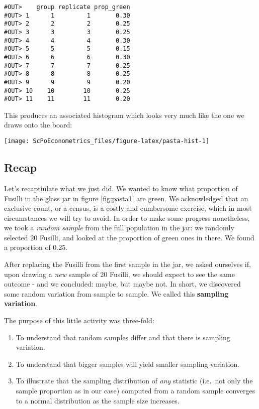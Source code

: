 \documentclass[]{book}
\providecommand{\tightlist}{%
  \setlength{\itemsep}{0pt}\setlength{\parskip}{0pt}}
\begin{document}
\begin{verbatim}
#OUT>    group replicate prop_green
#OUT> 1      1         1       0.30
#OUT> 2      2         2       0.25
#OUT> 3      3         3       0.25
#OUT> 4      4         4       0.30
#OUT> 5      5         5       0.15
#OUT> 6      6         6       0.30
#OUT> 7      7         7       0.25
#OUT> 8      8         8       0.25
#OUT> 9      9         9       0.20
#OUT> 10    10        10       0.25
#OUT> 11    11        11       0.20
\end{verbatim}

This produces an associated histogram which looks very much like the one we draws onto the board:

\begin{center}\texttt{[image: ScPoEconometrics\_files/figure-latex/pasta-hist-1]} \end{center}

\hypertarget{recap}{%
\subsection{Recap}\label{recap}}

Let's recaptiulate what we just did. We wanted to know what proportion of Fusilli in the glass jar in figure \ref{fig:pasta1} are green. We acknowledged that an exclusive count, or a census, is a costly and cumbersome exercise, which in most circumstances we will try to avoid. In order to make some progress nonetheless, we took a \emph{random sample} from the full population in the jar: we randomly selected 20 Fusilli, and looked at the proportion of green ones in there. We found a proportion of 0.25.

After replacing the Fusilli from the first sample in the jar, we asked ourselves if, upon drawing a \emph{new} sample of 20 Fusilli, we should expect to see the same outcome - and we concluded: maybe, but maybe not. In short, we discovered some random variation from sample to sample. We called this \textbf{sampling variation}.

The purpose of this little activity was three-fold:

\begin{enumerate}
\def\labelenumi{\arabic{enumi}.}
\tightlist
\item
  To understand that random samples differ and that there is sampling variation.
\item
  To understand that bigger samples will yield smaller sampling variation.
\item
  To illustrate that the sampling distribution of \emph{any} statistic (i.e.~not only the sample proportion as in our case) computed from a random sample converges to a normal distribution as the sample size increases.
\end{enumerate}
\end{document}
